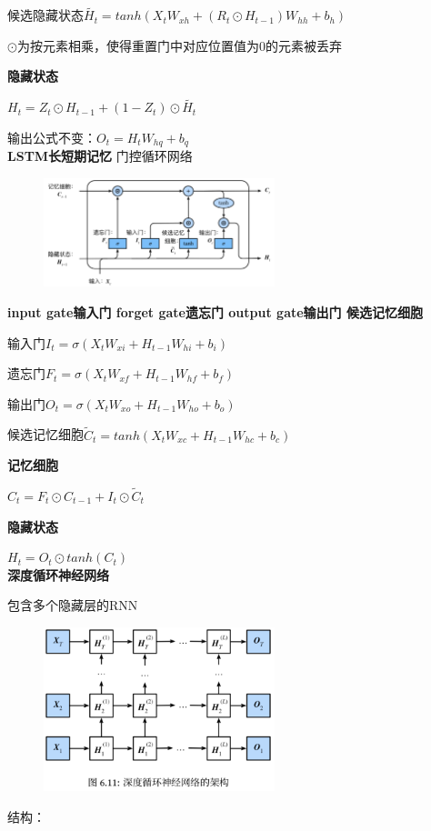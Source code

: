\documentclass[UTF8]{ctexart}
\begin{document}
  \quad 候选隐藏状态$\tilde{H_t} = tanh(X_tW_{xh} + (R_t \odot  H_{t-1})W_{hh} + b_h)$

  \quad \quad $\odot$为按元素相乘，使得重置门中对应位置值为0的元素被丢弃

  \textbf{隐藏状态}

  \quad $H_t = Z_t \odot H_{t-1} + (1-Z_t)\odot \tilde{H_t}$
  
  输出公式不变：$O_t = H_tW_{hq} + b_q$\\
\textbf{LSTM长短期记忆} 门控循环网络
  \begin{figure}[H] %
    \centering %
    \includegraphics[width=0.6\textwidth]{note_images/LSTM.png} %
  \end{figure}
  
  \textbf{input gate输入门 forget gate遗忘门 output gate输出门 候选记忆细胞}

  \quad 输入门$I_t = \sigma(X_tW_{xi} + H_{t-1}W_{hi} + b_i)$

  \quad 遗忘门$F_t = \sigma(X_tW_{xf} + H_{t-1}W_{hf} + b_f)$
  
  \quad 输出门$O_t = \sigma(X_tW_{xo} + H_{t-1}W_{ho} + b_o)$

  \quad 候选记忆细胞$\tilde{C}_t = tanh(X_tW_{xc} + H_{t-1}W_{hc} + b_c) $

  \textbf{记忆细胞}

  \quad $C_t = F_t \odot C_{t-1} + I_t \odot \tilde{C}_t$

  \textbf{隐藏状态}

  \quad $H_t = O_t \odot tanh(C_t)$\\
\textbf{深度循环神经网络}

  包含多个隐藏层的RNN
  \begin{figure}[H] %
    \centering %
    \includegraphics[width=0.6\textwidth]{note_images/deep_RNN.png} %
  \end{figure}
  结构：
\end{document}
